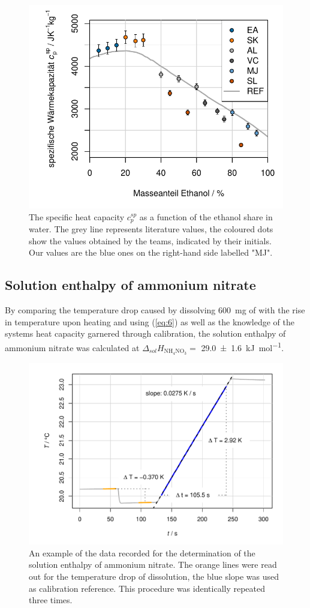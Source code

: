 \begin{figure}[H]
    \centering
    \includegraphics[width=.5\textwidth]{figures/plots/ethanol_alldata_5_4_in.pdf}
    \caption{The specific heat capacity $c^{sp}_p$ as a function of the ethanol share in water. The grey line represents literature values\cite{ethanol_water}, the coloured dots show the values obtained by the teams, indicated by their initials. Our values are the blue ones on the right-hand side labelled "MJ".}
    \label{fig:eth_all}
\end{figure}


\subsection{Solution enthalpy of ammonium nitrate}

By comparing the temperature drop caused by dissolving \qty{600}{\milli\gram} of  with the rise in temperature upon heating and using (\ref{eq:6}) as well as the knowledge of the systems heat capacity garnered through calibration, the solution enthalpy of ammonium nitrate was calculated at $\Delta_{sol}H_{\mathrm{NH_4NO_3}} = $ \qty{29.0 \pm 1.6}{\kilo\joule\per\mole}. 


\begin{figure}[H]
    \centering
    \includegraphics[width=.5\textwidth]{figures/plots/sol3.pdf}
    \caption{An example of the data recorded for the determination of the solution enthalpy of ammonium nitrate. The orange lines were read out for the temperature drop of dissolution, the blue slope was used as calibration reference. This procedure was identically repeated three times.}
    \label{fig:sol3}
\end{figure}



